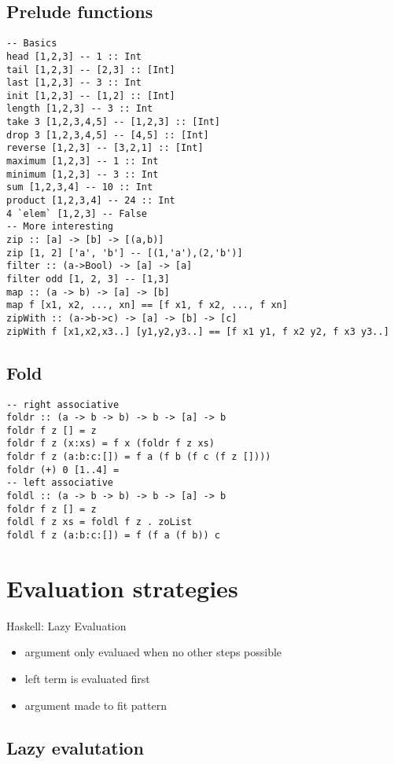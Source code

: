 \documentclass[12pt]{article}
\begin{document}
\subsection{Prelude functions}
\begin{verbatim}
-- Basics
head [1,2,3] -- 1 :: Int
tail [1,2,3] -- [2,3] :: [Int]
last [1,2,3] -- 3 :: Int
init [1,2,3] -- [1,2] :: [Int]
length [1,2,3] -- 3 :: Int
take 3 [1,2,3,4,5] -- [1,2,3] :: [Int]
drop 3 [1,2,3,4,5] -- [4,5] :: [Int]
reverse [1,2,3] -- [3,2,1] :: [Int]
maximum [1,2,3] -- 1 :: Int
minimum [1,2,3] -- 3 :: Int
sum [1,2,3,4] -- 10 :: Int
product [1,2,3,4] -- 24 :: Int
4 `elem` [1,2,3] -- False
-- More interesting
zip :: [a] -> [b] -> [(a,b)]
zip [1, 2] ['a', 'b'] -- [(1,'a'),(2,'b')]
filter :: (a->Bool) -> [a] -> [a]
filter odd [1, 2, 3] -- [1,3]
map :: (a -> b) -> [a] -> [b]
map f [x1, x2, ..., xn] == [f x1, f x2, ..., f xn]
zipWith :: (a->b->c) -> [a] -> [b] -> [c]
zipWith f [x1,x2,x3..] [y1,y2,y3..] == [f x1 y1, f x2 y2, f x3 y3..]
\end{verbatim}

\subsection{Fold}
\begin{verbatim}
-- right associative
foldr :: (a -> b -> b) -> b -> [a] -> b
foldr f z [] = z
foldr f z (x:xs) = f x (foldr f z xs)
foldr f z (a:b:c:[]) = f a (f b (f c (f z [])))
foldr (+) 0 [1..4] = 
-- left associative
foldl :: (a -> b -> b) -> b -> [a] -> b
foldr f z [] = z
foldl f z xs = foldl f z . zoList
foldl f z (a:b:c:[]) = f (f a (f b)) c
\end{verbatim}  



\section{Evaluation strategies}
Haskell: Lazy Evaluation 
\begin{itemize}
    \item argument only evaluaed when no other steps possible
    \item left term is evaluated first
    \item argument made to fit pattern
\end{itemize}
\subsection{Lazy evalutation}
\end{document}

